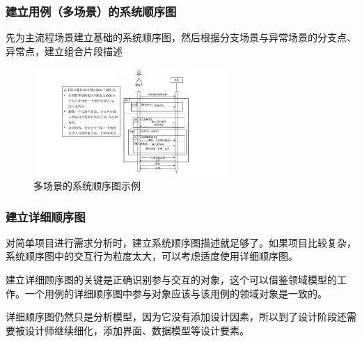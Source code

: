 \subsubsection{建立用例（多场景）的系统顺序图}
先为主流程场景建立基础的系统顺序图，然后根据分支场景与异常场景的分支点、异常点，建立组合片段描述
\begin{figure}[H]
	\centering
    \vspace{-0.2em}
	\includegraphics[width=0.65\textwidth]{img/多场景的系统顺序图示例.pdf}
    \caption*{多场景的系统顺序图示例}
    \vspace{-1em}
\end{figure}


\subsubsection{建立详细顺序图}
对简单项目进行需求分析时，建立系统顺序图描述就足够了。如果项目比较复杂，系统顺序图中的交互行为粒度太大，可以考虑适度使用详细顺序图。

建立详细顾序图的关键是正确识别参与交互的对象，这个可以借鉴领域模型的工作。一个用例的详细顺序图中参与对象应该与该用例的领域对象是一致的。

详细顺序图仍然只是分析模型，因为它没有添加设计因素，所以到了设计阶段还需要被设计师继续细化，添加界面、数据模型等设计要素。

